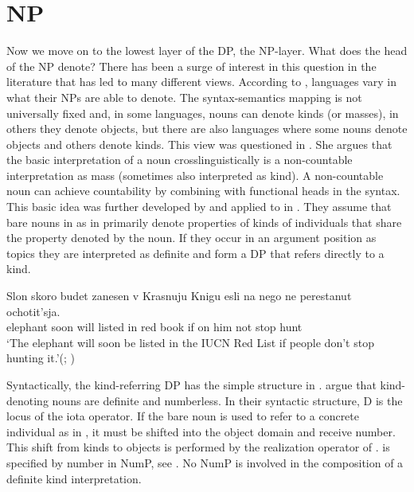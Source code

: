 \documentclass[output=paper]{langscibook}
\begin{document}
\section{NP}

Now we move on to the lowest layer of the DP, the NP-layer. What does the head of the NP denote? There has been a surge of interest in this question in the literature that has led to many different views. According to \cite{Chierchia1998}, languages vary in what their NPs are able to denote. The syntax-semantics mapping is not universally fixed and, in some languages, nouns can denote kinds (or masses), in others they denote objects, but there are also languages where some nouns denote objects and others denote kinds. This view was questioned in \cite{Borer2005}. She argues that the basic interpretation of a noun crosslinguistically is a non-countable interpretation as mass (sometimes also interpreted as kind). A non-countable noun can achieve countability by combining with functional heads in the syntax. This basic idea was further developed by \cite{Borik.Espinal2012, Borik.Espinal2015} and applied to  in \cite{Borik.Espinal2012}. They assume that bare nouns in  as in  primarily denote properties of kinds of individuals that share the property denoted by the noun. If they occur in an argument position as topics they are interpreted as definite and form a DP that refers directly to a kind.

\ea \label{ex:20}
\gll Slon skoro budet zanesen v Krasnuju Knigu esli na nego ne perestanut ochotit'sja.\\
   elephant soon will listed in red book if on him not stop hunt\\
\glt `The elephant will soon be listed in the IUCN Red List if people don’t stop hunting it.'\hfill (; \citealt[137]{Borik.Espinal2012})
\z

\noindent Syntactically, the kind-referring DP has the simple structure in . \citeauthor{Borik.Espinal2012} argue that kind-denoting nouns are definite and numberless. In their syntactic structure, D is the locus of the iota operator. If the bare noun is used to refer to a concrete individual as in , it must be shifted into the object domain and receive number. This shift from kinds to objects is performed by the realization operator  of \cite{Carlson1977}.  is specified by number in NumP, see . No NumP is involved in the composition of a definite kind interpretation.
\end{document}
